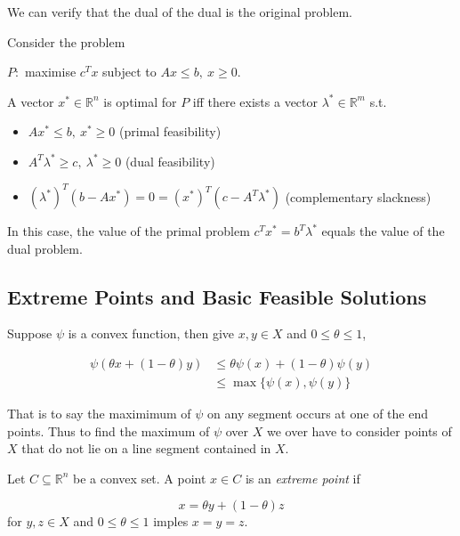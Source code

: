 \documentclass[a4paper]{article}
\begin{document}
We can verify that the dual of the dual is the original problem.

\begin{theorem}
  Consider the problem
  
  \begin{center}
    $P:$ maximise $c^T x$ subject to $Ax \leq b,\: x \geq 0$.
  \end{center}
  
  A vector $x^* \in \mathbb{R}^n$ is optimal for $P$ iff there exists a vector $\lambda^* \in \mathbb{R}^m$ s.t.

  \begin{itemize}
  \item $A x^* \leq b,\: x^* \geq 0$ \: (primal feasibility)
  \item $A^T \lambda^* \geq c,\: \lambda^* \geq 0$ \: (dual feasibility)
  \item $(\lambda^*)^T (b - A x^*) = 0 = (x^*)^T (c - A^T \lambda ^*)$ \: (complementary slackness)
  \end{itemize}
\end{theorem}

In this case, the value of the primal problem $c^T x^* = b^T \lambda^*$ equals the value of the dual problem.

\subsection{Extreme Points and Basic Feasible Solutions}

Suppose $\psi$ is a convex function, then give $x, y \in X$ and $0 \leq \theta \leq 1$,

\begin{align*}
  \psi(\theta x + (1 - \theta) y) & \leq \theta \psi(x) + (1 - \theta)\psi(y) \\
                                  &\leq \max\{\psi(x), \psi(y)\}
\end{align*}

That is to say the maximimum of $\psi$ on any segment occurs at one of the end points. Thus to find the maximum of $\psi$ over $X$ we over have to consider points of $X$ that do not lie on a line segment contained in $X$.

\begin{definition}
  Let $C \subseteq \mathbb{R}^n$ be a convex set. A point $x \in C$ is an \emph{extreme point} if

  \[
    x = \theta y + (1 - \theta) z
  \]
  for $y, z \in X$ and $0 \leq \theta \leq 1$ imples $x = y = z$.
\end{definition}
\end{document}
